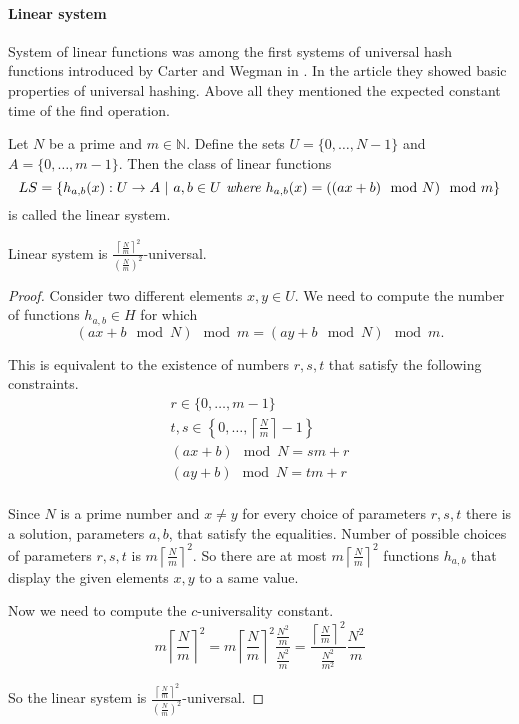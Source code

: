 \paragraph{Linear system}
System of linear functions was among the first systems of universal hash functions introduced by Carter and Wegman in \cite{DBLP:journals/jcss/CarterW79}. In the article they showed basic properties of universal hashing. Above all they mentioned the expected constant time of the find operation.
\begin{definition}
Let $N$ be a prime and $m \in \mathbb{N}$. Define the sets $U = \{0, \dots, N - 1 \}$ and $A = \{0, \dots, m - 1\}$. Then the class of linear functions 
\[ LS = \{h_{a, b}(x): U \rightarrow A \ | \  a, b \in U \textit{ where } h_{a, b}(x) = ((ax + b) \mod N) \mod m \} \]
is called the linear system.
\end{definition}

\begin{remark}
Linear system is $\frac{\left\lceil \frac{N}{m} \right\rceil ^ 2}{\left(\frac{N}{m}\right) ^ 2}$-universal.
\end{remark}
\begin{proof}
Consider two different elements $x, y \in U$. We need to compute the number of functions $h_{a, b} \in H$ for which 
\[ (ax + b \mod N) \mod m = (ay + b \mod N) \mod m \textit{.} \]

This is equivalent to the existence of numbers $r, s, t$ that satisfy the following constraints.
\begin{gather*}
r \in \{0, \dots, m - 1 \} \\
t, s \in \left\{ 0, \dots, \left \lceil \frac{N}{m} \right \rceil - 1 \right\} \\
(ax + b) \mod N = s m + r \\
(ay + b) \mod N = t m + r \\
\end{gather*}

Since $N$ is a prime number and $x \neq y$ for every choice of parameters $r, s, t$ there is a solution, parameters $a, b$, that satisfy the equalities.
Number of possible choices of parameters $r, s, t$ is $m \left \lceil \frac{N}{m} \right \rceil ^ 2$. So there are at most $m \left \lceil \frac{N}{m} \right \rceil ^ 2$ functions $h_{a, b}$ that display the given elements $x, y$ to a same value.

Now we need to compute the $c$-universality constant.
\[
m \left \lceil \frac{N}{m} \right \rceil ^ 2 = 
m \left \lceil \frac{N}{m} \right \rceil ^ 2 \frac{\frac{N ^ 2}{m}}{\frac{N ^ 2}{m}} = 
\frac{\left \lceil \frac{N}{m} \right \rceil ^ 2}{\frac{N ^ 2}{m ^ 2}} \frac{N ^ 2}{m}
\]

So the linear system is $\frac{\left \lceil \frac{N}{m} \right \rceil ^ 2}{\left(\frac{N}{m}\right) ^ 2}$-universal.
\end{proof}

